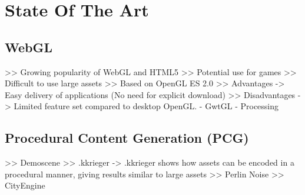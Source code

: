 \chapter{State Of The Art}

\section{WebGL}
    >> Growing popularity of WebGL and HTML5
    >> Potential use for games
    >> Difficult to use large assets
    >> Based on OpenGL ES 2.0
    >> Advantages
        -> Easy delivery of applications (No need for explicit download)
    >> Disadvantages
        -> Limited feature set compared to desktop OpenGL.
  - GwtGL
  - Processing

\section{Procedural Content Generation (PCG)}
    >> Demoscene
    >> .kkrieger
		-> .kkrieger shows how assets can be encoded in a procedural manner, giving results similar to large assets
    >> Perlin Noise
    >> CityEngine
